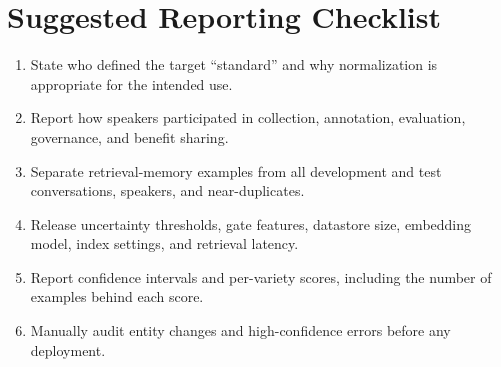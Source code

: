\section{Suggested Reporting Checklist}
\label{app:checklist}

\begin{enumerate}
  \item State who defined the target ``standard'' and why normalization is
        appropriate for the intended use.
  \item Report how speakers participated in collection, annotation,
        evaluation, governance, and benefit sharing.
  \item Separate retrieval-memory examples from all development and test
        conversations, speakers, and near-duplicates.
  \item Release uncertainty thresholds, gate features, datastore size,
        embedding model, index settings, and retrieval latency.
  \item Report confidence intervals and per-variety scores, including the
        number of examples behind each score.
  \item Manually audit entity changes and high-confidence errors before any
        deployment.
\end{enumerate}

